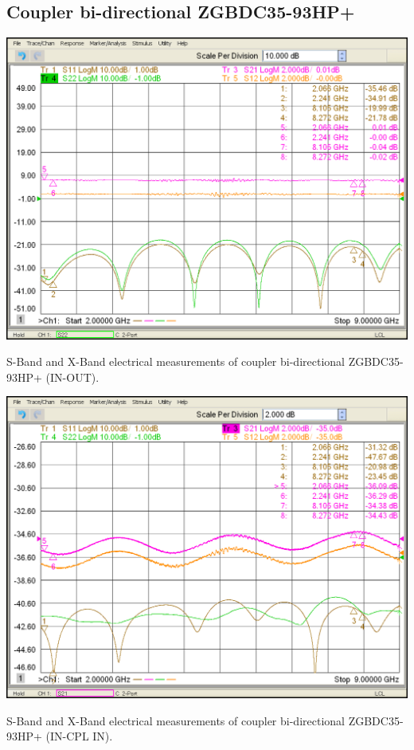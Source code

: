 \subsection{Coupler bi-directional ZGBDC35-93HP+}

\begin{table}[H]
	\centering
	\includegraphics[width=0.8\linewidth]{figuras/measures/Coupler ZGBDC35-93HP+ (IN-OUT)}
	\caption{S-Band and X-Band electrical measurements of coupler bi-directional ZGBDC35-93HP+ (IN-OUT).}
	\label{fig:ZGBDC35-93HP+(IN-OUT)}
\end{table}

\begin{table}[H]
	\centering
	\includegraphics[width=0.8\linewidth]{figuras/measures/Coupler ZGBDC35-93HP+ (IN-CPL IN)}
	\caption{S-Band and X-Band electrical measurements of coupler bi-directional ZGBDC35-93HP+ (IN-CPL IN).}
	\label{fig:ZGBDC35-93HP+ (IN-CPL IN)}
\end{table}

